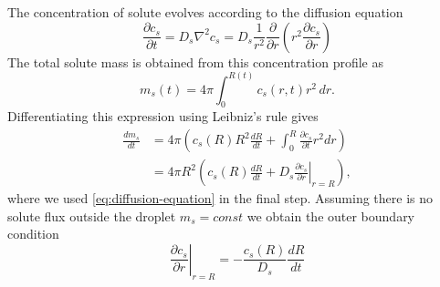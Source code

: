 \documentclass[12pt]{report}
\begin{document}
The concentration of solute evolves according to the diffusion equation
\begin{equation}\label{eq:diffusion-equation}
  \frac{\partial c_s}{\partial t}
  = D_s \nabla^2 c_s
  = D_s \frac{1}{r^2} \frac{\partial}{\partial r} \left( r^2 \frac{\partial c_s}{\partial r} \right)
\end{equation}
The total solute mass is obtained from this concentration profile as
\begin{equation}\label{eq:solute-mass-equation}
  m_s(t) = 4\pi \int_0^{R(t)} c_s(r,t) r^2 \, dr.
\end{equation}
Differentiating this expression using Leibniz's rule gives
\begin{equation}
  \begin{aligned}
    \frac{dm_s}{dt} &=
    4\pi \left(
    c_s(R) R^2 \frac{dR}{dt} + \int_0^R \frac{\partial c_s}{\partial t} r^2 dr
    \right) \\
    &=
    4\pi R^2 \left(
    c_s(R) \frac{dR}{dt} + D_s \left.\frac{\partial c_s}{\partial r}\right|_{r=R}
    \right),
  \end{aligned}
\end{equation}
where we used \eqref{eq:diffusion-equation} in the final step.
Assuming there is no solute flux outside the droplet $m_s = const$ we obtain the outer boundary condition
\begin{equation}
  \left.\frac{\partial c_s}{\partial r}\right|_{r=R} = -\frac{c_s(R)}{D_s} \frac{dR}{dt}
\end{equation}
\end{document}
